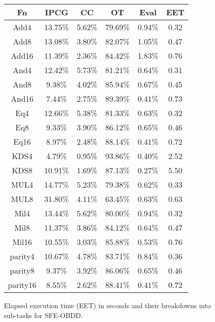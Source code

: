 \begin{figure}
\begin{center}
\begin{tabular}{|c|c|c|c|c|c|} \hline
Fn & IPCG &      CC &    OT &      Eval &     EET  \\ \hline

Add4 & 13.75\% & 5.62\% & 79.69\% & 0.94\% & 0.32 \\ \hline
Add8 & 13.08\% & 3.80\% & 82.07\% & 1.05\% & 0.47 \\ \hline
Add16 & 11.39\% & 2.36\% & 84.42\% & 1.83\% & 0.76 \\ \hline
And4 & 12.42\% & 5.73\% & 81.21\% & 0.64\% & 0.31 \\ \hline
And8 & 9.38\% & 4.02\% & 85.94\% & 0.67\% & 0.45 \\ \hline
And16 & 7.44\% & 2.75\% & 89.39\% & 0.41\% & 0.73 \\ \hline
Eq4 & 12.66\% & 5.38\% & 81.33\% & 0.63\% & 0.32 \\ \hline
Eq8 & 9.33\% & 3.90\% & 86.12\% & 0.65\% & 0.46 \\ \hline
Eq16 & 8.97\% & 2.48\% & 88.14\% & 0.41\% & 0.72 \\ \hline
KDS4 & 4.79\% & 0.95\% & 93.86\% & 0.40\% & 2.52 \\ \hline
KDS8 & 10.91\% & 1.69\% & 87.13\% & 0.27\% & 5.50 \\ \hline
MUL4 & 14.77\% & 5.23\% & 79.38\% & 0.62\% & 0.33 \\ \hline
MUL8 & 31.80\% & 4.11\% & 63.45\% & 0.63\% & 0.63 \\ \hline
Mil4 & 13.44\% & 5.62\% & 80.00\% & 0.94\% & 0.32 \\ \hline
Mil8 & 11.37\% & 3.86\% & 84.12\% & 0.64\% & 0.47 \\ \hline
Mil16 & 10.55\% & 3.03\% & 85.88\% & 0.53\% & 0.76 \\ \hline
parity4 & 10.67\% & 4.78\% & 83.71\% & 0.84\% & 0.36 \\ \hline
parity8 & 9.37\% & 3.92\% & 86.06\% & 0.65\% & 0.46 \\ \hline
parity16 & 8.55\% & 2.62\% & 88.41\% & 0.41\% & 0.72 \\ \hline

\end{tabular}
\end{center}
\caption{Elapsed execution time (EET) in seconds and their breakdowns into sub-tasks for
SFE-OBDD.}
\label{fig:OBDD-timing}
\end{figure}


